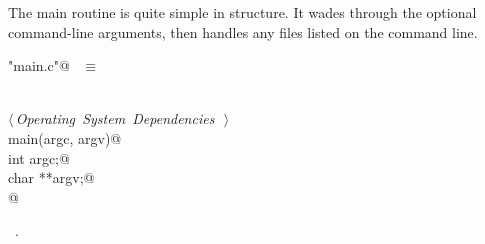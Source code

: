\documentclass{report}
\begin{document}
The main routine is quite simple in structure.
It wades through the optional command-line arguments,
then handles any files listed on the command line.
\begin{flushleft} \small
\begin{minipage}{\linewidth} \label{scrap14}
\verb@"main.c"@\nobreak\ {\footnotesize {} }$\equiv$
\vspace{-1ex}
\begin{list}{}{} \item
\mbox{}\verb@@\\
\mbox{}\verb@@\hbox{$\langle\,${\it Operating System Dependencies}\nobreak\ {\footnotesize {}}$\,\rangle$}\verb@@\\
\mbox{}\verb@int main(argc, argv)@\\
\mbox{}\verb@     int argc;@\\
\mbox{}\verb@     char **argv;@\\
\mbox{}@\\
\mbox{}\verb@@{\NWsep}
\end{list}
\vspace{-1ex}
\footnotesize\addtolength{\baselineskip}{-1ex}
\begin{list}{}{\setlength{\itemsep}{-\parsep}\setlength{\itemindent}{-\leftmargin}}
\item \NWtxtFileDefBy\ .
\end{list}
\vspace{-2ex}
\footnotesize\addtolength{\baselineskip}{-1ex}
\begin{list}{}{\setlength{\itemsep}{-\parsep}\setlength{\itemindent}{-\leftmargin}}

\end{list}
\end{minipage}
\end{flushleft}
\end{document}
